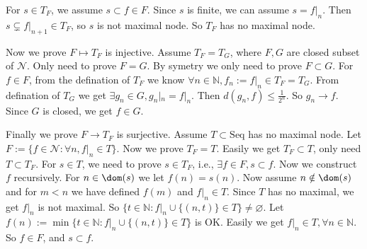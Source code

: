 \documentclass{ctexart}
\begin{document}
\begin{solution}
  For \(s \in T_F\), we assume \(s \subset f \in F\). 
  Since \(s\) is finite, we can assume \(s = f|_{n}\). Then \(s \subsetneq f|_{n+1} \in T_F\), 
  so \(s\) is not maximal node. So \(T_F\) has no maximal node. 

  Now we prove \(F \mapsto T_F\) is injective. 
  Assume \(T_F=T_G\), where \(F,G\) are closed subset of \(\mathcal{N}\). 
  Only need to prove \(F=G\). By symetry we only need to prove \(F \subset G\). 
  For \(f \in F\), from the defination of \(T_F\) we know \(\forall n \in \mathbb{N},f_n:=f|_{n} \in T_F=T_G\). 
  From defination of \(T_G\) we get \(\exists g_n \in G,g_n|_{n} = f|_{n}\). Then \(d(g_n,f) \leq \frac{1}{2^{n}}\). 
  So \(g_n \to f\). Since \(G\) is closed, we get \(f \in G\). 

  Finally we prove \(F \to T_F\) is surjective. 
  Assume \(T \subset \mathrm{Seq}\) has no maximal node. Let \(F:=\{f \in \mathcal{N}:\forall n,f|_{n} \in T\}\). 
  Now we prove \(T_F = T\). Easily we get \(T_F \subset T\), only need \(T \subset T_F\). 
  For \(s \in T\), we need to prove \(s \in T_F\), i.e., \(\exists f \in F,s \subset f\). 
  Now we construct \(f\) recursively. For \(n \in \dom(s)\) we let \(f(n)=s(n)\). 
  Now assume \(n \notin \dom(s)\) and for \(m<n\) we have defined \(f(m)\) and \(f|_{n} \in T\). 
  Since \(T\) has no maximal, we get \(f|_{n}\) is not maximal. So \(\{t \in \mathbb{N}:f|_{n}\cup \{(n,t)\} \in T\} \neq \varnothing\). 
  Let \(f(n):=\min \{t \in \mathbb{N}:f|_{n} \cup \{(n,t)\} \in T\}\) is OK. 
  Easily we get \(f|_{n} \in T,\forall n \in \mathbb{N}\). So \(f \in F\), and \(s \subset f\). 
\end{solution}
\end{document}
